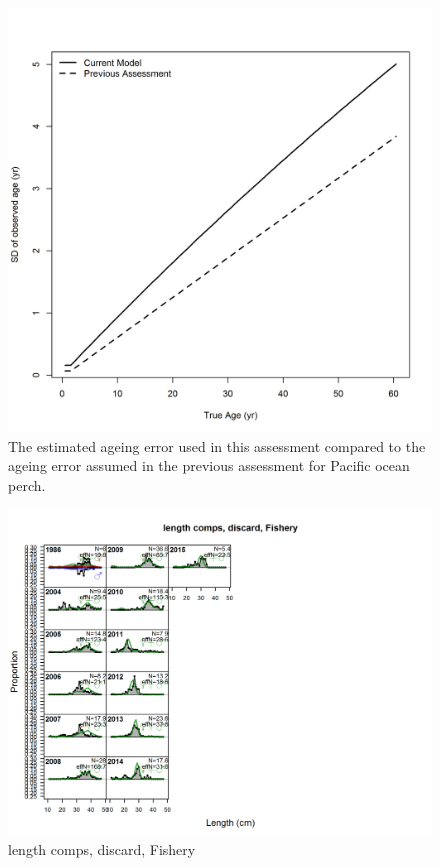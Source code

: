 \documentclass[12pt,]{article}
\begin{document}
\begin{figure}
\centering
\includegraphics{Figures/Ageing_Error.png}
\caption{The estimated ageing error used in this assessment compared to
the ageing error assumed in the previous assessment for Pacific ocean
perch. \label{fig:Age_Error}}
\end{figure}

\begin{figure}
\centering
\includegraphics{./r4ss/plots_mod1/comp_lenfit_flt1mkt1.png}
\caption{length comps, discard, Fishery
\label{fig:mod1_1_comp_lenfit_flt1mkt1}}
\end{figure}
\end{document}
